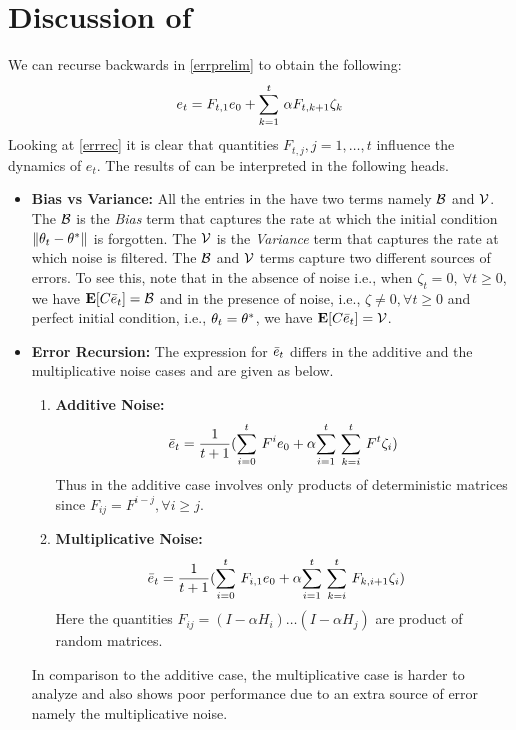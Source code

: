 \section{Discussion of }
We can recurse backwards in \eqref{errprelim} to obtain the following:
\begin{align}\label{errrec}
e_t=F_{t,1}e_0+\ous{\sum}{k=1}{t}\alpha F_{t,k+1}\zeta_k
\end{align}
Looking at \eqref{errrec} it is clear that quantities $F_{t,j}, j=1,\ldots,t$ influence the dynamics of $e_t$. The results of  can be interpreted in the following heads.
\begin{itemize}[leftmargin=*]
\item \textbf{Bias vs Variance:} All the entries in the  have two terms namely $\B$ and $\V$. The $\B$ is the \emph{Bias} term that captures the rate at which the initial condition $\norm{\theta_t-\ts}$ is forgotten. The $\V$ is the \emph{Variance} term that captures the rate at which noise is filtered. The $\B$ and $\V$ terms capture two different sources of errors. To see this, note that in the absence of noise i.e., when $\zeta_t=0,~\forall t\geq 0$, we have $\E[C\eb_t]=\B$ and in the presence of noise, i.e., $\zeta\neq 0,\forall t\geq 0$ and perfect initial condition, i.e., $\theta_t=\ts$, we have $\E[C\eb_t]=\V$.
\item \textbf{Error Recursion:} The expression for $\eb_t$ differs in the additive and the multiplicative noise cases and are given as below.
\begin{enumerate}
\item \textbf{Additive Noise:}
\begin{align}\label{addexpand}
\eb_t&=\frac{1}{t+1}(\ous{\sum}{i=0}{t} F^i e_0+ \alpha\ous{\sum}{i=1}{t} \ous{\sum}{k=i}{t} F^t  \zeta_i )\\
\end{align}
Thus in the additive case involves only products of deterministic matrices since $F_{ij}=F^{i-j},\forall i\geq j$.
\item \textbf{Multiplicative Noise:}
\begin{align}
\eb_t&=\frac{1}{t+1}(\ous{\sum}{i=0}{t} F_{i,1} e_0+ \alpha\ous{\sum}{i=1}{t} \ous{\sum}{k=i}{t} F_{k,i+1}  \zeta_i )
\end{align}
Here the quantities $F_{ij}=(I-\alpha H_i)\ldots (I-\alpha H_j)$ are product of random matrices.
\end{enumerate}
In comparison to the additive case, the multiplicative case is harder to analyze and also shows poor performance due to an extra source of error namely the multiplicative noise.


\end{itemize}
